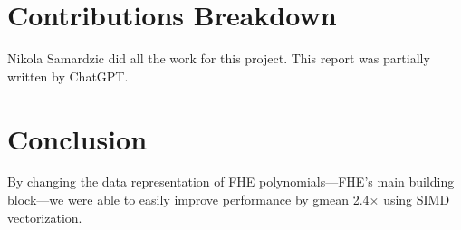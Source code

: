 \section{Contributions Breakdown}

Nikola Samardzic did all the work for this project. This report was partially
written by ChatGPT.

\section{Conclusion}\label{sec:conclusion}

By changing the data representation of FHE polynomials---FHE's main building
block---we were able to easily improve performance by gmean 2.4$\times$ using
SIMD vectorization.
